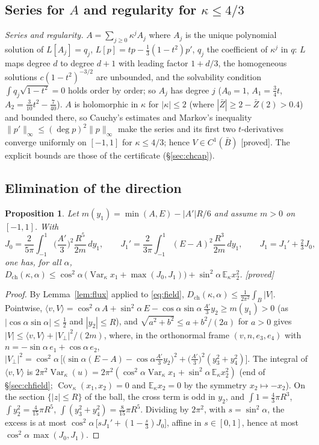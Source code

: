\documentclass[11pt,a4paper]{article}
\newtheorem{proposition}[theorem]{Proposition}
\theoremstyle{remark}
\theoremstyle{definition}
\theoremstyle{plain}
\theoremstyle{remark}
\newcommand{\E}{\mathbb{E}}
\newcommand{\Cov}{\operatorname{Cov}}
\newcommand{\Var}{\operatorname{Var}}
\newcommand{\st}[1]{\textsf{[#1]}}
\newcommand{\Zb}{\bar Z}
\newcommand{\Dch}{D_{\mathrm{ch}}}
\begin{document}
\subsection{Series for $A$ and regularity for $\kappa\le4/3$}\label{sec:chseries}

\emph{Series and regularity.} $A=\sum_{j\ge0}\kappa^jA_j$ where $A_j$ is the unique polynomial solution of
$L[A_j]=q_j$, $L[p]=tp-\frac13(1-t^2)p'$, $q_j$ the coefficient of $\kappa^j$ in $q$: $L$ maps degree $d$ to
degree $d+1$ with leading factor $1+d/3$, the homogeneous solutions $c(1-t^2)^{-3/2}$ are unbounded, and the
solvability condition $\int q_j\sqrt{1-t^2}=0$ holds order by order; so $A_j$ has degree $j$
($A_0=1$, $A_1=\frac34t$, $A_2=\frac3{10}t^2-\frac7{40}$). $A$ is holomorphic in $\kappa$ for $|\kappa|\le2$ (where
$|\Zb|\ge2-\Zb(2)>0.4$) and bounded there, so Cauchy's estimates and Markov's inequality $\|p'\|_\infty\le
(\deg p)^2\|p\|_\infty$ make the series and its first two $t$-derivatives converge uniformly on $[-1,1]$ for
$\kappa\le4/3$; hence $V\in C^1(\bar B)$ \st{proved}. The explicit bounds are those of the certificate
(\S\ref{sec:chcap}).


\subsection{Elimination of the direction}\label{sec:chalpha}

\begin{proposition}\label{prop:alpha}
Let $m(y_1)=\min(A,E)-|A'|R/6$ and assume $m>0$ on $[-1,1]$. With
\[
J_0=\frac{2}{5\pi}\int_{-1}^1\Big(\frac{A'}{3}\Big)^2\frac{R^5}{2m}\,dy_1,\qquad
J_1'=\frac{2}{3\pi}\int_{-1}^1(E-A)^2\frac{R^3}{2m}\,dy_1,\qquad J_1=J_1'+\tfrac23J_0,
\]
one has, for all $\alpha$,
$\Dch(\kappa,\alpha)\le\cos^2\alpha\,\big(\Var_\kappa x_1+\max(J_0,J_1)\big)+\sin^2\alpha\,\E_\kappa x_2^2$.
\st{proved}
\end{proposition}
\begin{proof}
By Lemma~\ref{lem:flux} applied to \eqref{eq:field}, $\Dch(\kappa,\alpha)\le\frac1{2\pi^2}\int_B|V|$.
Pointwise, $\langle v,V\rangle=\cos^2\!\alpha\,A+\sin^2\!\alpha\,E-\cos\alpha\sin\alpha\,\frac{A'}3y_2\ge m(y_1)>0$ (as
$|\cos\alpha\sin\alpha|\le\frac12$ and $|y_2|\le R$), and $\sqrt{a^2+b^2}\le a+b^2/(2a)$ for $a>0$ gives
$|V|\le\langle v,V\rangle+|V_\perp|^2/(2m)$, where, in the orthonormal frame $(v,n,e_3,e_4)$ with
$n=-\sin\alpha\,e_1+\cos\alpha\,e_2$,
$|V_\perp|^2=\cos^2\!\alpha\,\big[\big(\sin\alpha(E-A)-\cos\alpha\frac{A'}3y_2\big)^2+\big(\frac{A'}3\big)^2(y_3^2+y_4^2)\big]$.
The integral of $\langle v,V\rangle$ is $2\pi^2\Var_\kappa(u)=2\pi^2(\cos^2\!\alpha\Var_\kappa x_1+\sin^2\!\alpha\,\E_\kappa x_2^2)$
(end of \S\ref{sec:chfield}; $\Cov_\kappa(x_1,x_2)=0$ and $\E_\kappa x_2=0$ by the symmetry $x_2\mapsto-x_2$).
On the section $\{|z|\le R\}$ of the ball, the cross term is odd in $y_2$, and $\int1=\frac43\pi R^3$,
$\int y_2^2=\frac4{15}\pi R^5$, $\int(y_3^2+y_4^2)=\frac8{15}\pi R^5$. Dividing by $2\pi^2$, with $s=\sin^2\alpha$,
the excess is at most $\cos^2\!\alpha\,\big[sJ_1'+(1-\frac s3)J_0\big]$, affine in $s\in[0,1]$, hence at most
$\cos^2\!\alpha\,\max(J_0,J_1)$.
\end{proof}
\end{document}
